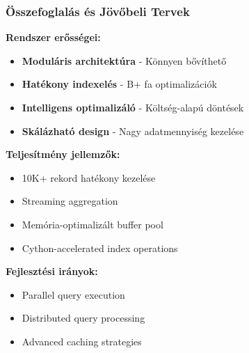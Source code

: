 \documentclass{beamer}
\begin{document}
\begin{frame}
\frametitle{Összefoglalás és Jövőbeli Tervek}

\textbf{Rendszer erősségei:}
\begin{itemize}
    \item \textbf{Moduláris architektúra} - Könnyen bővíthető
    \item \textbf{Hatékony indexelés} - B+ fa optimalizációk
    \item \textbf{Intelligens optimalizáló} - Költség-alapú döntések
    \item \textbf{Skálázható design} - Nagy adatmennyiség kezelése
\end{itemize}

\vspace{0.3cm}
\textbf{Teljesítmény jellemzők:}
\begin{itemize}
    \item 10K+ rekord hatékony kezelése
    \item Streaming aggregation
    \item Memória-optimalizált buffer pool
    \item Cython-accelerated index operations
\end{itemize}

\vspace{0.3cm}
\textbf{Fejlesztési irányok:}
\begin{itemize}
    \item Parallel query execution
    \item Distributed query processing
    \item Advanced caching strategies
\end{itemize}

\end{frame}
\end{document}
